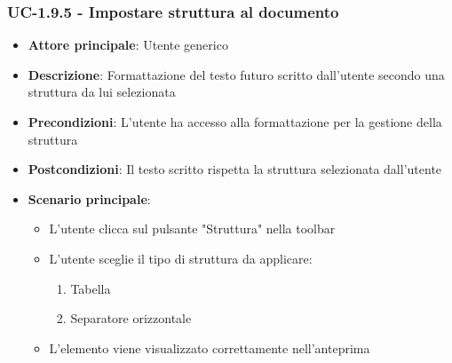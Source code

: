 \documentclass[11pt,a4paper]{article}
\begin{document}
\subsubsection{UC-1.9.5 - Impostare struttura al documento}
\begin{itemize}
    \item \textbf{Attore principale}: Utente generico
    \item \textbf{Descrizione}: Formattazione del testo futuro scritto dall’utente secondo una struttura da lui selezionata
    \item \textbf{Precondizioni}: L’utente ha accesso alla formattazione per la gestione della struttura
    \item \textbf{Postcondizioni}: Il testo scritto rispetta la struttura selezionata dall’utente
    \item \textbf{Scenario principale}:
        \begin{itemize}
            \item L’utente clicca sul pulsante "Struttura" nella toolbar
            \item L’utente sceglie il tipo di struttura da applicare:
                \begin{enumerate}
                    \item Tabella
                    \item Separatore orizzontale
                \end{enumerate}
            \item L'elemento viene visualizzato correttamente nell'anteprima
        \end{itemize}
\end{itemize}
\end{document}
